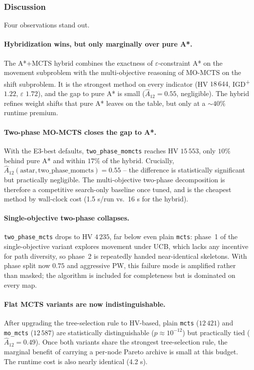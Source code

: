 \subsubsection{Discussion}
Four observations stand out.

\paragraph{Hybridization wins, but only marginally over pure A*.} The A*+MCTS hybrid combines the exactness of $\varepsilon$-constraint A* on the movement subproblem with the multi-objective reasoning of MO-MCTS on the shift subproblem. It is the strongest method on every indicator (HV $18\,644$, IGD\textsuperscript{+} $1.22$, $\varepsilon$ $1.72$), and the gap to pure A* is small ($\hat A_{12} = 0.55$, negligible). The hybrid refines weight shifts that pure A* leaves on the table, but only at a $\sim40\%$ runtime premium.

\paragraph{Two-phase MO-MCTS closes the gap to A*.} With the E3-best defaults, \texttt{two\_phase\_momcts} reaches HV $15\,553$, only $10\%$ behind pure A* and within $17\%$ of the hybrid. Crucially, $\hat A_{12}(\text{astar}, \text{two\_phase\_momcts}) = 0.55$ -- the difference is statistically significant but practically negligible. The multi-objective two-phase decomposition is therefore a competitive search-only baseline once tuned, and is the cheapest method by wall-clock cost (1.5 s/run vs.\ 16 s for the hybrid).

\paragraph{Single-objective two-phase collapses.} \texttt{two\_phase\_mcts} drops to HV $4\,235$, far below even plain \texttt{mcts}: phase~1 of the single-objective variant explores movement under UCB, which lacks any incentive for path diversity, so phase~2 is repeatedly handed near-identical skeletons. With phase split now $0.75$ and aggressive PW, this failure mode is amplified rather than masked; the algorithm is included for completeness but is dominated on every map.

\paragraph{Flat MCTS variants are now indistinguishable.} After upgrading the tree-selection rule to HV-based, plain \texttt{mcts} ($12\,421$) and \texttt{mo\_mcts} ($12\,587$) are statistically distinguishable ($p \approx 10^{-12}$) but practically tied ($\hat A_{12} = 0.49$). Once both variants share the strongest tree-selection rule, the marginal benefit of carrying a per-node Pareto archive is small at this budget. The runtime cost is also nearly identical (4.2 s).

